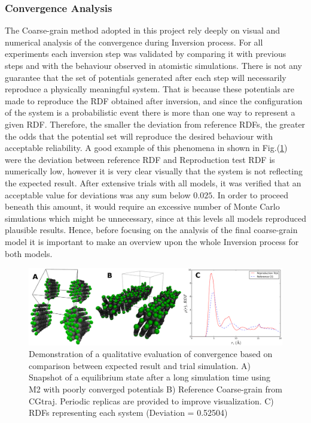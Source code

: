 \documentclass[10pt,a4paper,twoside]{article}
\begin{document}
\subsubsection{Convergence Analysis}
The Coarse-grain method adopted in this project rely deeply on visual and numerical analysis of the convergence during Inversion process. For all experiments each inversion step was validated by comparing it with previous steps and with the behaviour observed in atomistic simulations. There is not any guarantee that the set of potentials generated after each step will necessarily reproduce a physically meaningful system.  That is because these potentials are made to reproduce the RDF obtained after inversion, and since the configuration of the system is a probabilistic event there is more than one way to represent a given RDF. Therefore, the smaller the deviation from reference RDFs, the greater the odds that the potential set will reproduce the desired behaviour with acceptable reliability. A good example of this phenomena in shown in Fig.(\ref{Fig:wrong}) were the deviation between reference RDF and Reproduction test RDF is numerically low, however it is very clear visually that the system is not reflecting the expected result. After extensive trials  with all models, it was verified that an acceptable value for deviations was any sum below $0.025$. In order to proceed beneath this amount, it would require an excessive number of Monte Carlo simulations which might be unnecessary, since at this levels all models reproduced plausible results. Hence, before focusing on the analysis of the final coarse-grain model it is important to make an overview upon the whole Inversion process for both models.

\begin{figure}[ht!]
  \begin{center}
	\includegraphics[width=1 \textwidth]{./images/wrongM2}
	\caption{Demonstration of a qualitative evaluation of convergence based on comparison between expected result and trial simulation. A) Snapshot of a equilibrium state after a long simulation time using M2 with poorly converged potentials B) Reference Coarse-grain from CGtraj. Periodic replicas are provided to improve visualization. C) RDFs representing each system (Deviation  = 0.52504)}
	\label{Fig:wrong}
  \end{center}
\end{figure}
\end{document}
